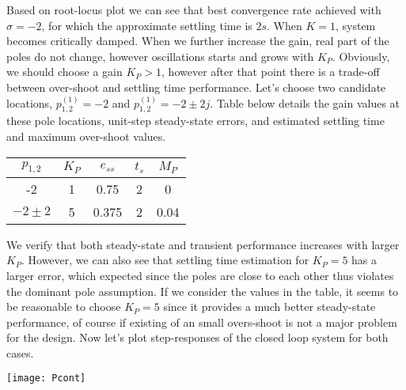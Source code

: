 \documentclass[twoside]{article}
\begin{document}
Based on root-locus plot we can see that best convergence rate 
achieved with $\sigma = -2$, for which the approximate settling time
is $2 s.$ When $K = 1$, system becomes critically damped. When we
further increase the gain, real part of the poles do not change,
however oscillations starts and grows with $K_P$. Obviously, we
should choose a gain $K_P > 1$, however after that point
there is a trade-off between over-shoot and settling time
performance. Let's choose two candidate locations, $p_{1,2}^{(1)} = -2$
and $p_{1,2}^{(1)} = -2 \pm 2 j$. Table below details
the gain values at these pole locations, unit-step steady-state errors,
and estimated settling time and maximum over-shoot values. 

\vspace{6pt}
\begin{minipage}[h]{1\linewidth}
\begin{center}
\begin{tabular}{|c | c | c | c | c  |}
\hline
$p_{1,2}$ & $K_P$ & $e_{ss}$ & $t_s$ & $M_P$
\\ \hline
-2 & 1 & 0.75 & 2 & 0
\\ \hline
$-2 \pm 2 $  & 5 & 0.375 & 2 & 0.04
\\ \hline
\end{tabular}
\end{center}
\end{minipage}
\vspace{6pt}

We verify that both steady-state and transient performance increases
with larger $K_P$. However, we can also see that settling time
estimation for $K_P = 5$ has a larger error, which expected
since the poles are close to each other thus violates the
dominant pole assumption. If we consider the values in the table, 
it seems to be reasonable to choose $K_P = 5$ since it provides a
much better steady-state performance, of course if existing
of an small overs-shoot is not a major problem for the design.
Now let's plot step-responses of the closed loop system for
both cases. 

\vspace{12 pt}

  \begin{minipage}[h]{1\linewidth}
    \begin{center}
      \texttt{[image: Pcont]}
    \end{center}
  \end{minipage}

\vspace{12 pt}
\end{document}
